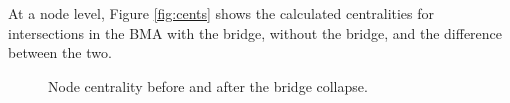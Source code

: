 \documentclass[11pt]{article}
\numberwithin{equation}{section} %
\numberwithin{figure}{section} %
\numberwithin{table}{section} %
\theoremstyle{definition}
\begin{document}
At a node level, Figure \ref{fig:cents} shows the calculated centralities for intersections in the BMA with the bridge, without the bridge, and the difference between the two.


\begin{figure}[t!]
  \caption{Node centrality before and after the bridge collapse.}
  \centering
\end{figure}
\end{document}
